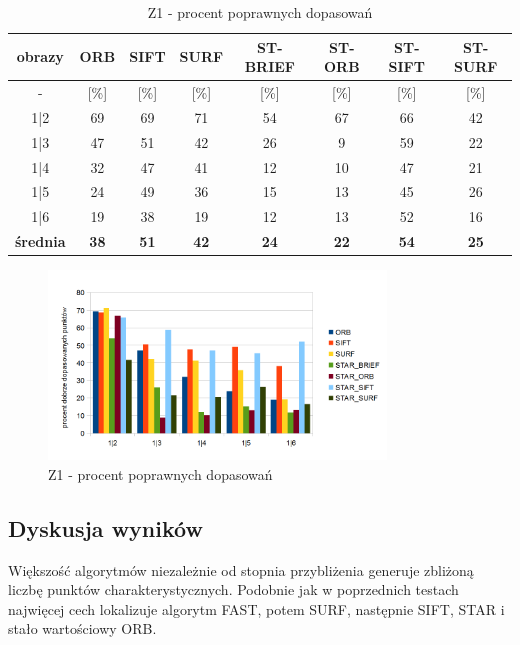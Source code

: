 \begin{table}[htbp]
  \centering
  \caption{Z1 - procent poprawnych dopasowań}
    \begin{tabular}{|c|c|c|c|c|c|c|c|}\hline
    obrazy & \textbf{ORB} & \textbf{SIFT} & \textbf{SURF} & \textbf{ST-BRIEF} & \textbf{ST-ORB} & \textbf{ST-SIFT} & \textbf{ST-SURF} \\\hline
     - & [\%] & [\%] & [\%] & [\%] & [\%] & [\%] & [\%] \\\hline
    1|2 & 69 & 69 & 71 & 54 & 67 & 66 & 42 \\
    1|3 & 47 & 51 & 42 & 26 & 9 & 59 & 22 \\
    1|4 & 32 & 47 & 41 & 12 & 10 & 47 & 21 \\
    1|5 & 24 & 49 & 36 & 15 & 13 & 45 & 26 \\
    1|6 & 19 & 38 & 19 & 12 & 13 & 52 & 16 \\\hline
    \textbf{średnia} & \textbf{38} & \textbf{51} & \textbf{42} & \textbf{24} & \textbf{22} & \textbf{54} & \textbf{25} \\\hline
    
    \end{tabular}%
  \label{tab:z1_m2}%
\end{table}%


\begin{figure}
\centering
\includegraphics[width=0.8\textwidth]{pict/slowik/z1/m2.png}
\caption{Z1 - procent poprawnych dopasowań}
\label{fig:z1_m2}
\end{figure}

\FloatBarrier
\subsection{Dyskusja wyników}
Większość algorytmów niezależnie od stopnia przybliżenia generuje zbliżoną liczbę punktów charakterystycznych. Podobnie jak w poprzednich testach najwięcej cech lokalizuje algorytm FAST, potem SURF, następnie SIFT, STAR i stało wartościowy ORB.

